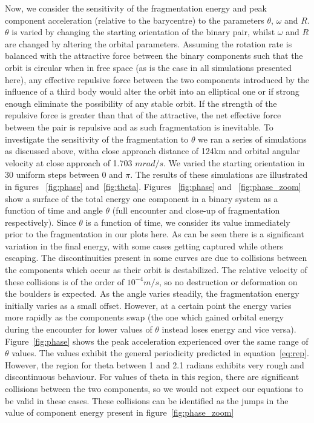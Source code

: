 \documentclass[letterpaper, preprint, paper,11pt]{AAS}	%
\begin{document}
Now, we consider the sensitivity of the fragmentation energy and peak component acceleration (relative to the barycentre) to the parameters $\theta$, $\omega$ and $R$. $\theta$ is varied by changing the starting orientation of the binary pair, whilst $\omega$ and $R$ are changed by altering the orbital parameters. Assuming the rotation rate is balanced with the attractive force between the binary components such that the orbit is circular when in free space (as is the case in all simulations presented here), any effective repulsive force between the two components introduced by the influence of a third body would alter the orbit into an elliptical one or if strong enough eliminate the possibility of any stable orbit. If the strength of the repulsive force is greater than that of the attractive, the net effective force between the pair is repulsive and as such fragmentation is inevitable. 
To investigate the sensitivity of the fragmentation to $\theta$ we ran a series of simulations as discussed above, witha close approach distance of 124km and orbital angular velocity at close approach of 1.703 $mrad/s$. We varied the starting orientation in 30 uniform steps between 0 and $\pi$. The results of these simulations are illustrated in figures ~\ref{fig:phase} and~\ref{fig:theta}. Figures ~\ref{fig:phase} and ~\ref{fig:phase_zoom} show a surface of the total energy one component in a binary system as a function of time and angle $\theta$ (full encounter and close-up of fragmentation respectively). Since $\theta$ is a function of time, we consider its value immediately prior to the fragmentation in our plots here.
As can be seen there is a significant variation in the final energy, with some cases getting captured while others escaping. The discontinuities present in some curves are due to collisions between the components which occur as their orbit is destabilized. The relative velocity of these collisions is of the order of $10^{-4}m/s$,  so no destruction or deformation on the boulders is expected. As the angle varies steadily, the fragmentation energy initially varies as a small offset. However, at a certain point the energy varies more rapidly as the components swap (the one which gained orbital energy during the encounter for lower values of $\theta$ instead loses energy and vice versa). Figure~\ref{fig:phase} shows the peak acceleration experienced over the same range of $\theta$ values. The values exhibit the general periodicity predicted in equation~\ref{eq:rep}. However, the region for theta between 1 and 2.1 radians exhibits very rough and discontinuous behaviour. For values of theta in this region, there are significant collisions between the two components, so we would not expect our equations to be valid in these cases. These collisions can be identified as the jumps in the value of component energy present in figure~\ref{fig:phase_zoom}
\end{document}
